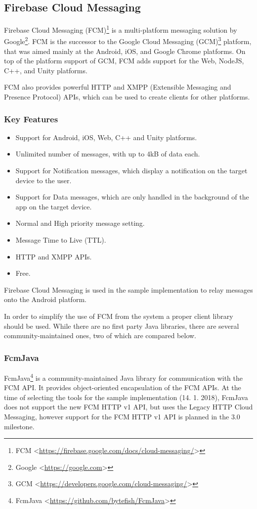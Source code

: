 \subsection{Firebase Cloud Messaging}
Firebase Cloud Messaging (FCM)\footnote{FCM <\url{https://firebase.google.com/docs/cloud-messaging/}>} is a multi-platform messaging solution by Google\footnote{Google <\url{https://google.com}>}. FCM is the successor to the Google Cloud Messaging (GCM)\footnote{GCM <\url{https://developers.google.com/cloud-messaging/}>} platform, that was aimed mainly at the Android, iOS, and Google Chrome platforms. On top of the platform support of GCM, FCM adds support for the Web, NodeJS, C++, and Unity platforms. 

FCM also provides powerful HTTP and XMPP (Extensible Messaging and Presence Protocol) APIs, which can be used to create clients for other platforms.

\subsubsection*{Key Features\cite{fcm}}
\begin{itemize}
\item Support for Android, iOS, Web, C++ and Unity platforms.
\item Unlimited number of messages, with up to 4kB of data each.
\item Support for Notification messages, which display a notification on the target device to the user.
\item Support for Data messages, which are only handled in the background of the app on the target device.
\item Normal and High priority message setting.
\item Message Time to Live (TTL).
\item HTTP and XMPP APIs.
\item Free.
\end{itemize}

Firebase Cloud Messaging is used in the sample implementation to relay messages onto the Android platform.

In order to simplify the use of FCM from the system a proper client library should be used. While there are no first party Java libraries, there are several community-maintained ones, two of which are compared below.

\subsubsection{FcmJava}
FcmJava\footnote{FcmJava <\url{https://github.com/bytefish/FcmJava}>} is a community-maintained Java library for communication with the FCM API. It provides object-oriented encapsulation of the FCM APIs. At the time of selecting the tools for the sample implementation (14. 1. 2018), FcmJava does not support the new FCM HTTP v1 API, but uses the Legacy HTTP Cloud Messaging, however support for the FCM HTTP v1 API is planned in the 3.0 milestone\cite{fcmJava}.

